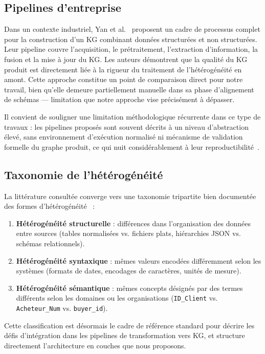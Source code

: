 \subsection{Pipelines d'entreprise}
Dans un contexte industriel, Yan et al.~\cite{yan2023enterprise} proposent un cadre de processus complet pour la construction d'un KG combinant données structurées et non structurées. Leur pipeline couvre l'acquisition, le prétraitement, l'extraction d'information, la fusion et la mise à jour du KG. Les auteurs démontrent que la qualité du KG produit est directement liée à la rigueur du traitement de l'hétérogénéité en amont. Cette approche constitue un point de comparaison direct pour notre travail, bien qu'elle demeure partiellement manuelle dans sa phase d'alignement de schémas — limitation que notre approche vise précisément à dépasser.

Il convient de souligner une limitation méthodologique récurrente dans ce type de travaux : les pipelines proposés sont souvent décrits à un niveau d'abstraction élevé, sans environnement d'exécution normalisé ni mécanisme de validation formelle du graphe produit, ce qui nuit considérablement à leur reproductibilité~\cite{wu2023comprehensive}.

\subsection{Taxonomie de l'hétérogénéité}
La littérature consultée converge vers une taxonomie tripartite bien documentée des formes d'hétérogénéité~\cite{survey_heterogeneous_kg_2023} :
\begin{enumerate}
    \item \textbf{Hétérogénéité structurelle} : différences dans l'organisation des données entre sources (tables normalisées vs. fichiers plats, hiérarchies JSON vs. schémas relationnels).
    \item \textbf{Hétérogénéité syntaxique} : mêmes valeurs encodées différemment selon les systèmes (formats de dates, encodages de caractères, unités de mesure).
    \item \textbf{Hétérogénéité sémantique} : mêmes concepts désignés par des termes différents selon les domaines ou les organisations (\texttt{ID\_Client} vs. \texttt{Acheteur\_Num} vs. \texttt{buyer\_id}).
\end{enumerate}
Cette classification est désormais le cadre de référence standard pour décrire les défis d'intégration dans les pipelines de transformation vers KG, et structure directement l'architecture en couches que nous proposons.


